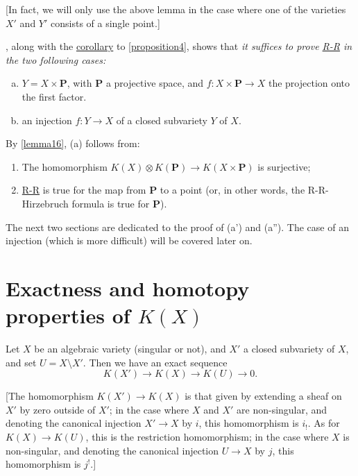 \documentclass{article}
\theoremstyle{plain}
\newenvironment{proposition}[1]
    {\renewcommand\theinnercustomproposition{#1}\innercustomproposition}
    {\endinnercustomproposition}
\theoremstyle{definition}
\newcommand{\PP}{\mathbf{P}}
\begin{document}
[In fact, we will only use the above lemma in the case where one of the varieties $X'$ and $Y'$ consists of a single point.]

, along with the \hyperref[corollary5]{corollary} to \cref{proposition4}, shows that \emph{it suffices to prove \hyperref[theoremriemannroch]{R-R} in the two following cases:}
\begin{enumerate}[(a)]
  \item $Y=X\times\PP$, with $\PP$ a projective space, and $f\colon X\times\PP\to X$ the projection onto the first factor.
  \item an injection $f\colon Y\to X$ of a closed subvariety $Y$ of $X$.
\end{enumerate}

By \cref{lemma16}, (a) follows from:
\begin{enumerate}
  \item[\rm{(a')}] The homomorphism $K(X)\otimes K(\PP)\to K(X\times\PP)$ is surjective;
  \item[\rm{(a'')}] \hyperref[theoremriemannroch]{R-R} is true for the map from $\PP$ to a point (or, in other words, the R-R-Hirzebruch formula is true for $\PP$).
\end{enumerate}

The next two sections are dedicated to the proof of (a') and (a'').
The case of an injection (which is more difficult) will be covered later on.


\section{Exactness and homotopy properties of $K(X)$}
\label{section8}

\begin{proposition}{7}
\label{proposition7}
  Let $X$ be an algebraic variety (singular or not), and $X'$ a closed subvariety of $X$, and set $U=X\setminus X'$.
  Then we have an exact sequence
  \[
    K(X') \to K(X) \to K(U) \to 0.
  \]
\end{proposition}

[The homomorphism $K(X')\to K(X)$ is that given by extending a sheaf on $X'$ by zero outside of $X'$;
in the case where $X$ and $X'$ are non-singular, and denoting the canonical injection $X'\to X$ by $i$, this homomorphism is $i_!$.
As for $K(X)\to K(U)$, this is the restriction homomorphism;
in the case where $X$ is non-singular, and denoting the canonical injection $U\to X$ by $j$, this homomorphism is $j^!$.]
\end{document}
